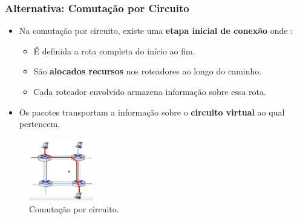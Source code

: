     \subsubsection*{Alternativa: Comutação por Circuito}
    \begin{itemize}[left=0.5cm, align=left, nosep]
        \item Na comutação por circuito, existe uma \textbf{etapa inicial de conexão} onde :        
        \begin{itemize}[left=0.5cm, nosep, label=$\hookrightarrow$]
            \item É definida a rota completa do início ao fim. 
            \item São \textbf{alocados recursos} nos roteadores ao longo do caminho. 
            \item Cada roteador envolvido armazena informação sobre essa rota. 
        \end{itemize} 
        \item Os pacotes transportam a informação sobre o \textbf{circuito virtual} ao qual pertencem.
    \end{itemize}

    \begin{figure}[H]
        \centering
        \includegraphics[width=0.25\textwidth]{img/cap-01/comutacao-circuitos.png}
        \caption{Comutação por circuito.}
    \end{figure}

